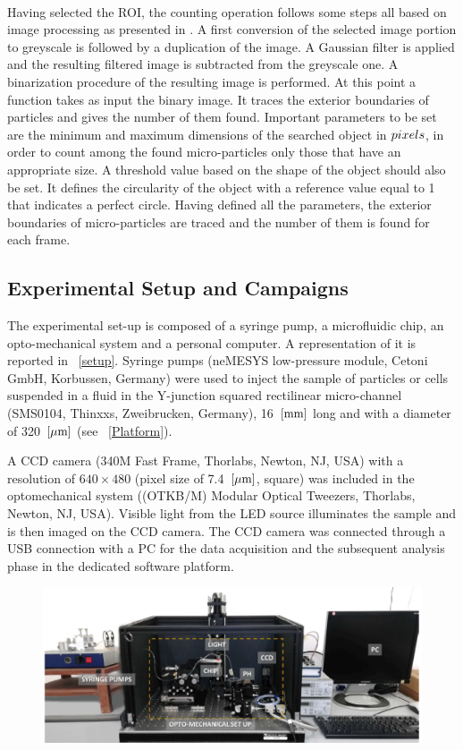 \documentclass[journal]{IEEEtran}
\theoremstyle{definition}
\theoremstyle{remark}
\begin{document}
\\Having selected the ROI, the counting operation follows some steps all based on image processing as presented in . A first conversion of the selected image portion to greyscale is followed by a duplication of the image. A Gaussian filter is applied and the resulting filtered image is subtracted from the greyscale one. A binarization procedure of the resulting image is performed.
At this point a function takes as input the binary image. It traces the exterior boundaries of particles and gives the number of them found.
Important parameters to be set are the minimum and maximum dimensions of the searched object in $pixels$, in order to count among the found micro-particles only those that have an appropriate size. A threshold value based on the shape of the object should also be set. It defines the circularity of the object with a reference value equal to 1 that indicates a perfect circle.
Having defined all the parameters, the exterior boundaries of micro-particles are traced and the number of them is found for each frame.

\subsection{Experimental Setup and Campaigns}\label{sec:setup}

The experimental set-up is composed of a syringe pump, a microfluidic chip, an opto-mechanical system and a personal computer. A representation of it is reported in ~\fig\ref{setup}. Syringe pumps (neMESYS low-pressure module, Cetoni GmbH,
Korbussen, Germany) were used to inject the sample of particles or cells suspended in a fluid in the Y-junction squared rectilinear micro-channel (SMS0104, Thinxxs, Zweibrucken, Germany), 16~$[\rm mm]$ long and with a diameter of 320~$[\rm\mu m]$ (see ~\fig\ref{Platform}).


A CCD camera (340M Fast Frame, Thorlabs, Newton, NJ, USA) with a resolution of $640 \times 480$ \pixel (pixel size of 7.4~$[\rm\mu m]$, square) was included in the optomechanical system ((OTKB/M) Modular Optical Tweezers, Thorlabs, Newton, NJ, USA). Visible light from the LED source illuminates the sample and is then imaged on the CCD camera.
The CCD camera was connected through a USB connection with a PC for the data acquisition and the subsequent analysis phase in the dedicated software platform.


\begin{figure}[t]
	\centering
	\includegraphics[width=2\columnwidth]{images/setup}
\end{figure}
\end{document}
